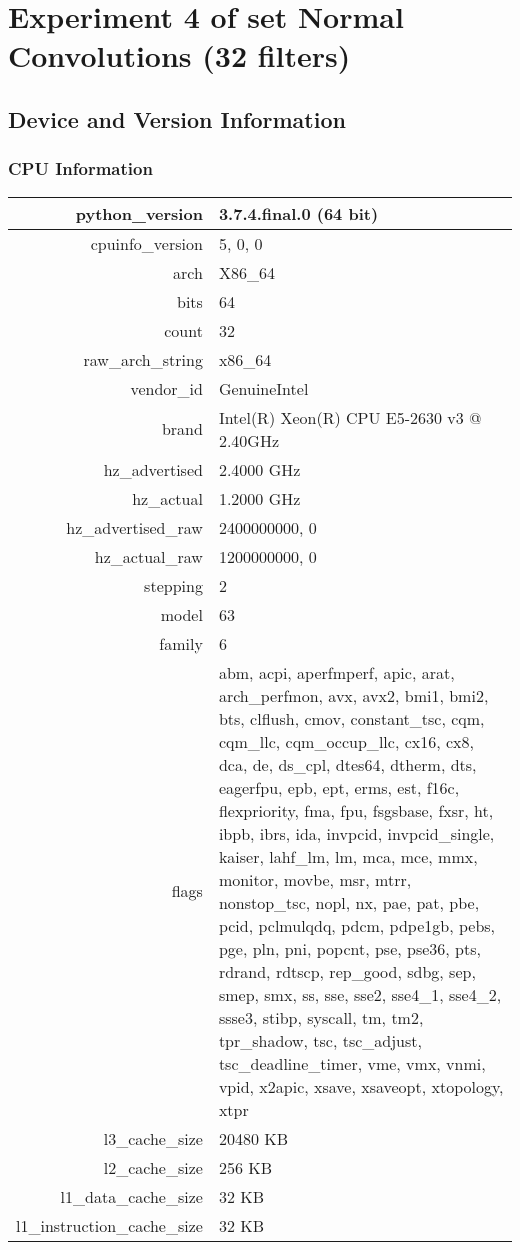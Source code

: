 \documentclass{article}%
\begin{document}
%
\normalsize%
\section{Experiment 4 of set Normal Convolutions (32 filters)}%
\label{sec:Experiment 4 of set Normal Convolutions (32 filters)}%
\subsection{Device and Version Information}%
\label{subsec:Device and Version Information}%
\subsubsection{CPU Information}%
\label{ssubsec:CPU Information}%
\begin{tabular}{|r|p{8cm}|}%
\hline%
python\_version&3.7.4.final.0 (64 bit)\\%
\hline%
cpuinfo\_version&5, 0, 0\\%
\hline%
arch&X86\_64\\%
\hline%
bits&64\\%
\hline%
count&32\\%
\hline%
raw\_arch\_string&x86\_64\\%
\hline%
vendor\_id&GenuineIntel\\%
\hline%
brand&Intel(R) Xeon(R) CPU E5{-}2630 v3 @ 2.40GHz\\%
\hline%
hz\_advertised&2.4000 GHz\\%
\hline%
hz\_actual&1.2000 GHz\\%
\hline%
hz\_advertised\_raw&2400000000, 0\\%
\hline%
hz\_actual\_raw&1200000000, 0\\%
\hline%
stepping&2\\%
\hline%
model&63\\%
\hline%
family&6\\%
\hline%
flags&abm, acpi, aperfmperf, apic, arat, arch\_perfmon, avx, avx2, bmi1, bmi2, bts, clflush, cmov, constant\_tsc, cqm, cqm\_llc, cqm\_occup\_llc, cx16, cx8, dca, de, ds\_cpl, dtes64, dtherm, dts, eagerfpu, epb, ept, erms, est, f16c, flexpriority, fma, fpu, fsgsbase, fxsr, ht, ibpb, ibrs, ida, invpcid, invpcid\_single, kaiser, lahf\_lm, lm, mca, mce, mmx, monitor, movbe, msr, mtrr, nonstop\_tsc, nopl, nx, pae, pat, pbe, pcid, pclmulqdq, pdcm, pdpe1gb, pebs, pge, pln, pni, popcnt, pse, pse36, pts, rdrand, rdtscp, rep\_good, sdbg, sep, smep, smx, ss, sse, sse2, sse4\_1, sse4\_2, ssse3, stibp, syscall, tm, tm2, tpr\_shadow, tsc, tsc\_adjust, tsc\_deadline\_timer, vme, vmx, vnmi, vpid, x2apic, xsave, xsaveopt, xtopology, xtpr\\%
\hline%
l3\_cache\_size&20480 KB\\%
\hline%
l2\_cache\_size&256 KB\\%
\hline%
l1\_data\_cache\_size&32 KB\\%
\hline%
l1\_instruction\_cache\_size&32 KB\\%
\hline%
\end{tabular}
\end{document}
